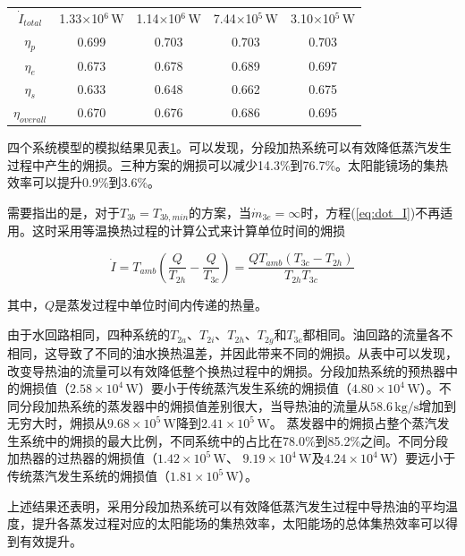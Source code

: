 \begin{table}[htbp]
\begin{center}
\begin{tabular}{ccccc}
		$\dot{I}_{total}$    &    1.33$\times$10$^6\,\mathrm{W}$    &  1.14$\times$10$^6\,\mathrm{W}$  &	7.44$\times$10$^5\,\mathrm{W}$	&	3.10$\times$10$^5\,\mathrm{W}$\\
		$\eta_p$    &    0.699    &	0.703	&    0.703	&	0.703\\
		$\eta_e$    &    0.673    &	0.678	& 0.689	&	0.697\\
		$\eta_s$    &    0.633    &  0.648	&  0.662	&	0.675\\
		$\eta_{overall}$    &    0.670   &	0.676	&    0.686	&	0.695\\
		\bottomrule
	\end{tabular}
	\end{center}
	\label{tab:comparison}
\end{table}

四个系统模型的模拟结果见表\ref{tab:comparison}。可以发现，分段加热系统可以有效降低蒸汽发生过程中产生的㶲损。三种方案的㶲损可以减少14.3\%到76.7\%。太阳能镜场的集热效率可以提升0.9\%到3.6\%。

需要指出的是，对于$T_{3b} = T_{3b,min}$的方案，当$\dot{m}_{3e} = \infty$时，方程(\ref{eq:dot_I})不再适用。这时采用等温换热过程的计算公式来计算单位时间的㶲损

\begin{equation}
  \dot{I} = T_{amb} (\frac{Q}{T_{2h}} - \frac{Q}{T_{3c}}) = \frac{QT_{amb}(T_{3c} - T_{2h})}{T_{2h}T_{3c}}
  \label{eq:isothermal}
\end{equation}

其中，$Q$是蒸发过程中单位时间内传递的热量。

由于水回路相同，四种系统的$T_{2a}$、$T_{2i}$、$T_{2h}$、$T_{2g}$和$T_{3c}$都相同。油回路的流量各不相同，这导致了不同的油水换热温差，并因此带来不同的㶲损。从表中可以发现，改变导热油的流量可以有效降低整个换热过程中的㶲损。分段加热系统的预热器中的㶲损值（$2.58\times 10^4\,\mathrm{W}$）要小于传统蒸汽发生系统的㶲损值（$4.80\times10^4\,\mathrm{W}$）。不同分段加热系统的蒸发器中的㶲损值差别很大，当导热油的流量从$58.6\,\mathrm{kg/s}$增加到无穷大时，㶲损从$9.68\times10^5\,\mathrm{W}$降到$2.41\times10^5\,\mathrm{W}$。
蒸发器中的㶲损占整个蒸汽发生系统中的㶲损的最大比例，不同系统中的占比在78.0\%到85.2\%之间。不同分段加热器的过热器的㶲损值（$1.42\times 10^5\,\mathrm{W}$、 $9.19\times 10^4\,\mathrm{W}$及$4.24\times 10^4\,\mathrm{W}$）要远小于传统蒸汽发生系统的㶲损值（$1.81\times10^5\,\mathrm{W}$）。

上述结果还表明，采用分段加热系统可以有效降低蒸汽发生过程中导热油的平均温度，提升各蒸发过程对应的太阳能场的集热效率，太阳能场的总体集热效率可以得到有效提升。

